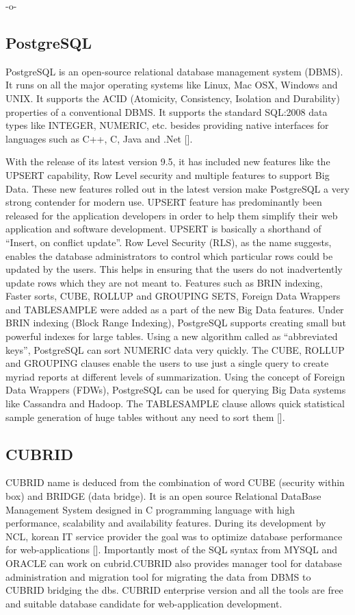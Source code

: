      -o-
     
\subsection{PostgreSQL}

PostgreSQL is an open-source relational database management system
(DBMS).  It runs on all the major operating systems like Linux, Mac
OSX, Windows and UNIX.  It supports the ACID (Atomicity, Consistency,
Isolation and Durability) properties of a conventional DBMS.  It
supports the standard SQL:2008 data types like INTEGER, NUMERIC,
etc. besides providing native interfaces for languages such as C++, C,
Java and .Net [\cite{www-postgreSQL-about}].

With the release of its latest version 9.5, it has included new
features like the UPSERT capability, Row Level security and multiple
features to support Big Data.  These new features rolled out in the
latest version make PostgreSQL a very strong contender for modern use.
UPSERT feature has predominantly been released for the application
developers in order to help them simplify their web application and
software development.  UPSERT is basically a shorthand of ``Insert, on
conflict update''.  Row Level Security (RLS), as the name suggests,
enables the database administrators to control which particular rows
could be updated by the users.  This helps in ensuring that the users
do not inadvertently update rows which they are not meant to.
Features such as BRIN indexing, Faster sorts, CUBE, ROLLUP and
GROUPING SETS, Foreign Data Wrappers and TABLESAMPLE were added as a
part of the new Big Data features.  Under BRIN indexing (Block Range
Indexing), PostgreSQL supports creating small but powerful indexes for
large tables.  Using a new algorithm called as ``abbreviated keys'',
PostgreSQL can sort NUMERIC data very quickly.  The CUBE, ROLLUP and
GROUPING clauses enable the users to use just a single query to create
myriad reports at different levels of summarization.  Using the
concept of Foreign Data Wrappers (FDWs), PostgreSQL can be used for
querying Big Data systems like Cassandra and Hadoop.  The TABLESAMPLE
clause allows quick statistical sample generation of huge tables
without any need to sort them [\cite{www-postgreSQL-features}].

\subsection{CUBRID}

CUBRID name is deduced from the combination of word CUBE (security
within box) and BRIDGE (data bridge).  It is an open source Relational
DataBase Management System designed in C programming language with
high performance, scalability and availability features. During its
development by NCL, korean IT service provider the goal was to
optimize database performance for
web-applications [\cite{www-cubrid}]. Importantly most of the SQL syntax
from MYSQL and ORACLE can work on cubrid.CUBRID also provides manager
tool for database administration and migration tool for migrating the
data from DBMS to CUBRID bridging the dbs.  CUBRID enterprise version
and all the tools are free and suitable database candidate for
web-application development.

